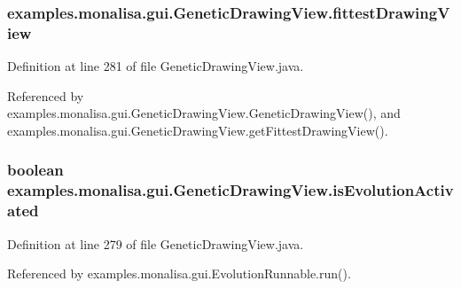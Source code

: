 \hypertarget{classexamples_1_1monalisa_1_1gui_1_1_genetic_drawing_view_a1e46cb2a37922bd7bc43dd7ca877d7a2}{
\subsubsection[{fittest\-Drawing\-View}]{ examples.\-monalisa.\-gui.\-Genetic\-Drawing\-View.\-fittest\-Drawing\-View\hspace{0.3cm}{\ttfamily [private]}}}\label{classexamples_1_1monalisa_1_1gui_1_1_genetic_drawing_view_a1e46cb2a37922bd7bc43dd7ca877d7a2}


Definition at line 281 of file Genetic\-Drawing\-View.\-java.



Referenced by examples.\-monalisa.\-gui.\-Genetic\-Drawing\-View.\-Genetic\-Drawing\-View(), and examples.\-monalisa.\-gui.\-Genetic\-Drawing\-View.\-get\-Fittest\-Drawing\-View().

\hypertarget{classexamples_1_1monalisa_1_1gui_1_1_genetic_drawing_view_a0fcd46bd3a086d71217753e1f6881796}{
\subsubsection[{is\-Evolution\-Activated}]{\setlength{\rightskip}{0pt plus 5cm}boolean examples.\-monalisa.\-gui.\-Genetic\-Drawing\-View.\-is\-Evolution\-Activated\hspace{0.3cm}{\ttfamily [private]}}}\label{classexamples_1_1monalisa_1_1gui_1_1_genetic_drawing_view_a0fcd46bd3a086d71217753e1f6881796}


Definition at line 279 of file Genetic\-Drawing\-View.\-java.



Referenced by examples.\-monalisa.\-gui.\-Evolution\-Runnable.\-run().


